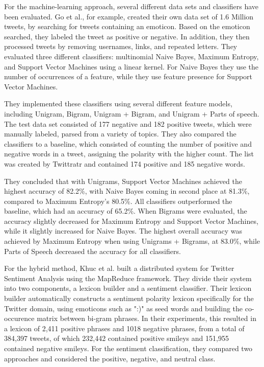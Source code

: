 For the machine-learning approach, several different data sets and classifiers have been evaluated. Go et al., for example, created their own data set of 1.6 Million tweets, by searching for tweets containing an emoticon. Based on the emoticon searched, they labeled the tweet as positive or negative. In addition, they then processed tweets by removing usernames, links, and repeated letters. They evaluated three different classifiers: multinomial Naive Bayes, Maximum Entropy, and Support Vector Machines using a linear kernel. For Naive Bayes  they use the number of occurrences of a feature, while they use feature presence for Support Vector Machines. 

They implemented these classifiers using several different feature models, including Unigram, Bigram, Unigram + Bigram, and Unigram + Parts of speech. The test data set consisted of 177 negative and 182 positive tweets, which were manually labeled, parsed from a variety of topics. They also compared the classifiers to a baseline, which consisted of counting the number of positive and negative words in a tweet, assigning the polarity with the higher count. The list was created by Twittratr and contained 174 positive and 185 negative words. 

They concluded that with Unigrams, Support Vector Machines achieved the highest accuracy of 82.2\%, with Naive Bayes coming in second place at 81.3\%, compared to Maximum Entropy's 80.5\%. All classifiers outperformed the baseline, which had an accuracy of 65.2\%. When Bigrams were evaluated, the accuracy slightly decreased for Maximum Entropy and Support Vector Machines, while it slightly increased for Naive Bayes. The highest overall accuracy was achieved by Maximum Entropy when using Unigrams + Bigrams, at 83.0\%, while Parts of Speech decreased the accuracy for all classifiers.

For the hybrid method, Khuc et al. built a distributed system for Twitter Sentiment Analysis using the MapReduce framework. They divide their system into two components, a lexicon builder and a sentiment classifier. Their lexicon builder automatically constructs a sentiment polarity lexicon specifically for the Twitter domain, using emoticons such as ":)" as seed words and building the co-occurence matrix between bi-gram phrases. In their experiments, this resulted in a lexicon of 2,411 positive phrases and 1018 negative phrases, from a total of 384,397 tweets, of which 232,442 contained positive smileys and 151,955 contained negative smileys. For the sentiment classification, they compared two approaches and considered the positive, negative, and neutral class. 

